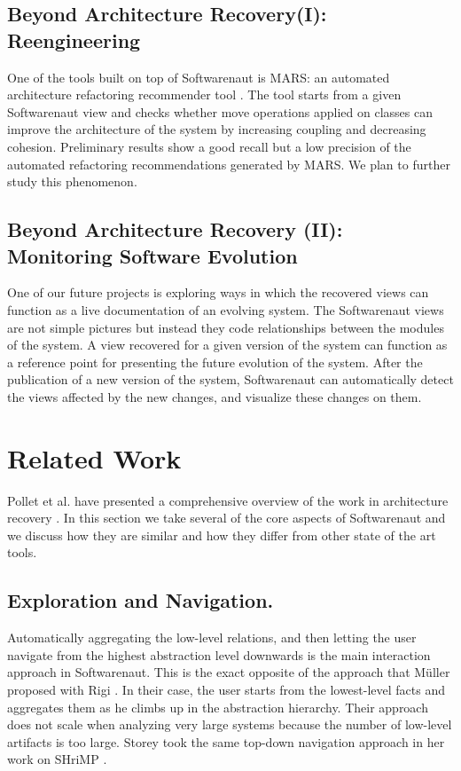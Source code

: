 \documentclass[preprint,12pt]{elsarticle}
\begin{document}
\subsection {Beyond Architecture Recovery(I): Reengineering}
One of the tools built on top of Softwarenaut is MARS: an automated architecture refactoring recommender tool \cite{bockmann-mars}. The tool starts from a given Softwarenaut view and checks whether move operations applied on classes can improve the architecture of the system by increasing coupling and decreasing cohesion. Preliminary results show a good recall but a low precision of the  automated refactoring recommendations generated by MARS. We plan to further study this phenomenon.


\subsection {Beyond Architecture Recovery (II): Monitoring Software Evolution}

One of our future projects is exploring ways in which the recovered views can function as a live documentation of an evolving system. The Softwarenaut views are not simple pictures but instead they code relationships between the modules of the system. A view recovered for a given version of the system can function as a reference point for presenting the future evolution of the system. After the publication of a new version of the system, Softwarenaut can automatically detect the views affected by the new changes, and visualize these changes on them.


\newpage
\section {Related Work}
\label {sec:rel}

Pollet et al. have presented a comprehensive overview of the work in architecture recovery \cite{pollet-sar}. In this section we take several of the core aspects of Softwarenaut and we discuss how they are similar and how they differ from other state of the art tools.

\subsection {Exploration and Navigation.} Automatically aggregating the low-level relations, and then letting the user navigate from the highest abstraction level downwards is the main interaction approach in Softwarenaut. This is the exact opposite of the approach that M{\"u}ller proposed with Rigi \cite{muller-revengenv}. In their case, the user starts from the lowest-level facts and aggregates them as he climbs up in the abstraction hierarchy. Their approach does not scale when analyzing very large systems because the number of low-level artifacts is too large. Storey took the same top-down navigation approach in her work on SHriMP \cite{storey-shrimp}.
\end{document}

